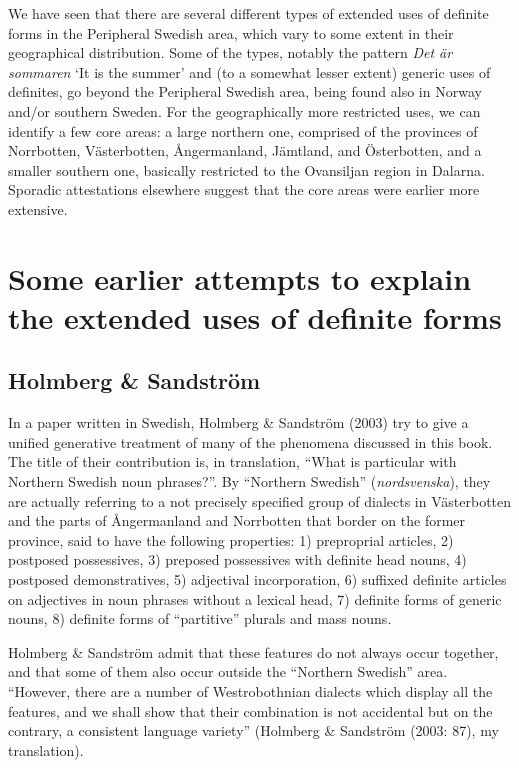 \begin{styleBodyTextFirst}
We have seen that there are several different types of extended uses of definite forms in the Peripheral Swedish area, which vary to some extent in their geographical distribution. Some of the types, notably the pattern \textit{Det är sommaren} ‘It is the summer’  and (to a somewhat lesser extent) generic uses of definites, go beyond the Peripheral Swedish area, being found also in Norway and/or southern Sweden. For the geographically more restricted uses, we can identify a few core areas: a large northern one, comprised of the provinces of Norrbotten, Västerbotten, Ångermanland, Jämtland, and Österbotten, and a smaller southern one, basically restricted to the Ovansiljan region in Dalarna. Sporadic attestations elsewhere suggest that the core areas were earlier more extensive.

\end{styleBodyTextFirst}

\section{Some earlier attempts to explain the extended uses of definite forms}
\subsection{\rmfamily Holmberg \& Sandström}

\begin{styleBodyTextFirst}
In a paper written in Swedish, Holmberg \& Sandström (2003) try to give a unified generative treatment of many of the phenomena discussed in this book. The title of their contribution is, in translation, “What is particular with Northern Swedish noun phrases?”. By “Northern Swedish” (\textit{nordsvenska}), they are actually referring to a not precisely specified group of dialects in Västerbotten and the parts of Ångermanland and Norrbotten that border on the former province, said to have the following properties: 1) preproprial articles, 2) postposed possessives, 3) preposed possessives with definite head nouns, 4) postposed demonstratives, 5) adjectival incorporation, 6) suffixed definite articles on adjectives in noun phrases without a lexical head, 7) definite forms of generic nouns, 8) definite forms of “partitive” plurals and mass nouns.

\end{styleBodyTextFirst}

\begin{styleBodytextC}
Holmberg \& Sandström admit that these features do not always occur together, and that some of them also occur outside the “Northern Swedish” area. “However, there are a number of Westrobothnian dialects which display all the features, and we shall show that their combination is not accidental but on the contrary, a consistent language variety” (Holmberg \& Sandström (2003: 87), my translation).

\end{styleBodytextC}

